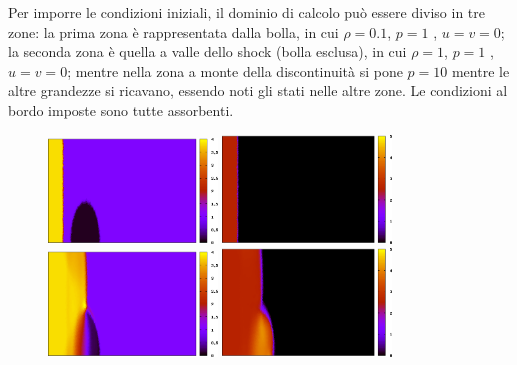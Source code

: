Per imporre le condizioni iniziali, il dominio di calcolo può essere diviso in tre zone: la prima zona è rappresentata dalla bolla, in cui $\rho = 0.1$, $p = 1$ , $u = v = 0 $; la seconda zona è quella a valle dello shock (bolla esclusa), in cui $\rho = 1$, $p = 1$ , $u = v = 0 $; mentre nella zona a monte della discontinuità si pone $p = 10$ mentre le altre grandezze si ricavano, essendo noti gli stati nelle altre zone. Le condizioni al bordo imposte sono tutte assorbenti.

\begin{figure}[htbp]
\centering
\includegraphics[width=0.4\textwidth]{images/ShockBubbleNew/height-solution0000bis.png} \hspace{0.2cm} 
\includegraphics[width=0.4\textwidth]{images/ShockBubbleNew/velocity-solution0000bis.png} \\[0.5cm]
\includegraphics[width=0.4\textwidth]{images/ShockBubbleNew/height-solution0010bis.png} \hspace{0.2cm}
\includegraphics[width=0.4\textwidth]{images/ShockBubbleNew/velocity-solution0010bis.png}  \\[0.5cm] 

\end{figure}
